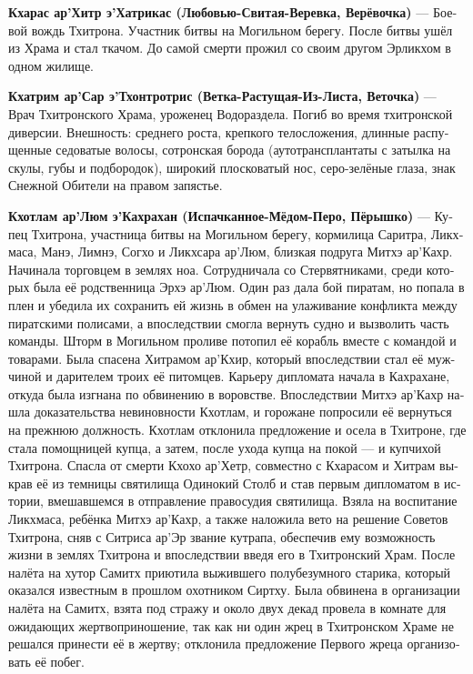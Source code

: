 \documentclass[a4paper,12pt,fleqn]{book}\usepackage{cooltooltips}\usepackage{polyglossia}\setdefaultlanguage[babelshorthands=true]{russian}\setotherlanguage{english}\defaultfontfeatures{Ligatures=TeX,Mapping=tex-text} \usepackage{xcolor}\definecolor{lightgray}{HTML}{bbbbbb}\color{lightgray}\newcommand{\ml}[3]{\textenglish{\textcolor{black}{#3}}}
\newcommand{\theterm}[3]{\textbf{\hypertarget{#1}{#2}} --- #3}
\begin{document}
{\theterm{kcharas}
{Кхарас ар’Хитр э’Хатрикас (Любовью-Свитая-Веревка, Верёвочка)}
{Боевой вождь Тхитрона.
Участник битвы на Могильном берегу.
После битвы ушёл из Храма и стал ткачом.
До самой смерти прожил со своим другом Эрликхом в одном жилище.}

\theterm{kchatrim}
{Кхатрим ар’Сар э’Тхонтротрис (Ветка-Растущая-Из-Листа, Веточка)}
{Врач Тхитронского Храма, уроженец Водораздела.
Погиб во время тхитронской диверсии.
Внешность: среднего роста, крепкого телосложения, длинные распущенные седоватые волосы, сотронская борода (аутотрансплантаты с затылка на скулы, губы и подбородок), широкий плосковатый нос, серо-зелёные глаза, знак Снежной Обители на правом запястье.}

\theterm{kchotlam}
{Кхотлам ар’Люм э’Кахрахан (Испачканное-Мёдом-Перо, Пёрышко)}
{Купец Тхитрона, участница битвы на Могильном берегу, кормилица Саритра, Ликхмаса, Манэ, Лимнэ, Согхо и Ликхсара ар'Люм, близкая подруга Митхэ ар'Кахр.
Начинала торговцем в землях ноа.
Сотрудничала со Стервятниками, среди которых была её родственница Эрхэ ар'Люм.
Один раз дала бой пиратам, но попала в плен и убедила их сохранить ей жизнь в обмен на улаживание конфликта между пиратскими полисами, а впоследствии смогла вернуть судно и вызволить часть команды.
Шторм в Могильном проливе потопил её корабль вместе с командой и товарами.
Была спасена Хитрамом ар'Кхир, который впоследствии стал её мужчиной и дарителем троих её питомцев.
Карьеру дипломата начала в Кахрахане, откуда была изгнана по обвинению в воровстве.
Впоследствии Митхэ ар'Кахр нашла доказательства невиновности Кхотлам, и горожане попросили её вернуться на прежнюю должность.
Кхотлам отклонила предложение и осела в Тхитроне, где стала помощницей купца, а затем, после ухода купца на покой --- и купчихой Тхитрона.
Спасла от смерти Кхохо ар'Хетр, совместно с Кхарасом и Хитрам выкрав её из темницы святилища Одинокий Столб и став первым дипломатом в истории, вмешавшемся в отправление правосудия святилища.
Взяла на воспитание Ликхмаса, ребёнка Митхэ ар'Кахр, а также наложила вето на решение Советов Тхитрона, сняв с Ситриса ар'Эр звание кутрапа, обеспечив ему возможность жизни в землях Тхитрона и впоследствии введя его в Тхитронский Храм.
После налёта на хутор Самитх приютила выжившего полубезумного старика, который оказался известным в прошлом охотником Сиртху.
Была обвинена в организации налёта на Самитх, взята под стражу и около двух декад провела в комнате для ожидающих жертвоприношение, так как ни один жрец в Тхитронском Храме не решался принести её в жертву;
отклонила предложение Первого жреца организовать её побег.
}}
\end{document}
